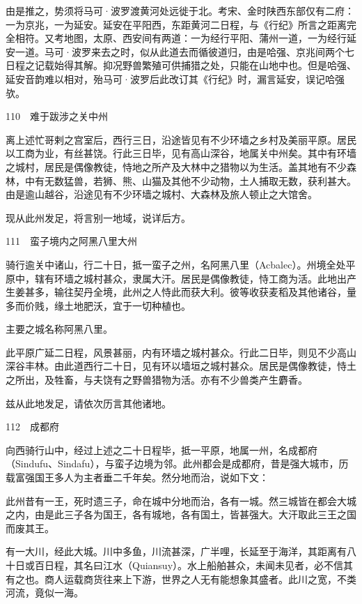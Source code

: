 \documentclass[12pt,UTF8]{ctexbook}
\begin{document}
由是推之，势须将马可·波罗渡黄河处远徙于北。考宋、金时陕西东部仅有二府：一为京兆，一为延安。延安在平阳西，东距黄河二日程，与《行纪》所言之距离完全相符。又考地图，太原、西安间有两道：一为经行平阳、蒲州一道，一为经行延安一道。马可·波罗来去之时，似从此道去而循彼道归，由是哈强、京兆间两个七日程之记载始得其解。抑况野兽繁殖可供捕猎之处，只能在山地中也。但是哈强、延安音韵难以相对，殆马可·波罗后此改订其《行纪》时，漏言延安，误记哈强欤。





110　难于跋涉之关中州

离上述忙哥剌之宫室后，西行三日，沿途皆见有不少环墙之乡村及美丽平原。居民以工商为业，有丝甚饶。行此三日毕，见有高山深谷，地属关中州矣。其中有环墙之城村，居民是偶像教徒，恃地之所产及大林中之猎物以为生活。盖其地有不少森林，中有无数猛兽，若狮、熊、山猫及其他不少动物，土人捕取无数，获利甚大。由是逾山越谷，沿途见有不少环墙之城村、大森林及旅人顿止之大馆舍。

现从此州发足，将言别一地域，说详后方。





111　蛮子境内之阿黑八里大州

骑行逾关中诸山，行二十日，抵一蛮子之州，名阿黑八里（Acbalec）。州境全处平原中，辖有环墙之城村甚众，隶属大汗。居民是偶像教徒，恃工商为活。此地出产生姜甚多，输往契丹全境，此州之人恃此而获大利。彼等收获麦稻及其他诸谷，量多而价贱，缘土地肥沃，宜于一切种植也。

主要之城名称阿黑八里。

此平原广延二日程，风景甚丽，内有环墙之城村甚众。行此二日毕，则见不少高山深谷丰林。由此道西行二十日，见有环以墙垣之城村甚众。居民是偶像教徒，恃土之所出，及牲畜，与夫饶有之野兽猎物为活。亦有不少兽类产生麝香。

兹从此地发足，请依次历言其他诸地。





112　成都府

向西骑行山中，经过上述之二十日程毕，抵一平原，地属一州，名成都府（Sindufu、Sindafu），与蛮子边境为邻。此州都会是成都府，昔是强大城市，历载富强国王多人为主者垂二千年矣。然分地而治，说如下文：

此州昔有一王，死时遗三子，命在城中分地而治，各有一城。然三城皆在都会大城之内，由是此三子各为国王，各有城地，各有国土，皆甚强大。大汗取此三王之国而废其王。

有一大川，经此大城。川中多鱼，川流甚深，广半哩，长延至于海洋，其距离有八十日或百日程，其名曰江水（Quiansuy）。水上船舶甚众，未闻未见者，必不信其有之也。商人运载商货往来上下游，世界之人无有能想象其盛者。此川之宽，不类河流，竟似一海。
\end{document}
